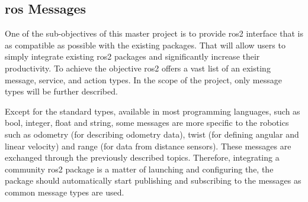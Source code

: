 

\subsection{\ac{ros} Messages}
One of the sub-objectives of this master project is to provide \ac{ros2} interface that is as compatible as possible with the existing packages.
That will allow users to simply integrate existing \ac{ros2} packages and significantly increase their productivity.
To achieve the objective \ac{ros2} offers a vast list of an existing message, service, and action types.
In the scope of the project, only message types will be further described.

Except for the standard types, available in most programming languages, such as bool, integer, float and string, some messages are more specific to the robotics such as odometry (for describing odometry data), twist (for defining angular and linear velocity) and range (for data from distance sensors).
These messages are exchanged through the previously described topics.
Therefore, integrating a community \ac{ros2} package is a matter of launching and configuring the, the package should automatically start publishing and subscribing to the messages as common message types are used.

